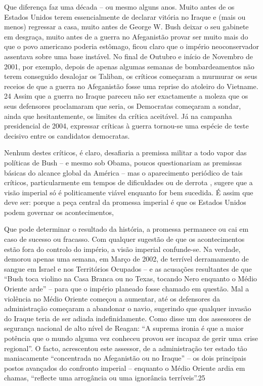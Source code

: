  \par 
Que diferença faz uma década – ou mesmo alguns anos. Muito antes de os Estados Unidos terem essencialmente de declarar vitória no Iraque e (mais ou menos) regressar a casa, muito antes de George W. Bush deixar o seu gabinete em desgraça, muito antes de a guerra no Afeganistão provar ser muito mais do que o povo americano poderia estômago, ficou claro que o império neoconservador assentava sobre uma base instável. No final de Outubro e início de Novembro de 2001, por exemplo, depois de apenas algumas semanas de bombardeamentos não terem conseguido desalojar os Taliban, os críticos começaram a murmurar os seus receios de que a guerra no Afeganistão fosse uma reprise do atoleiro do Vietname. {\color{blue}24} Assim que a guerra no Iraque pareceu não ser exactamente a moleza que os seus defensores proclamaram que seria, os Democratas começaram a sondar, ainda que hesitantemente, os limites da crítica aceitável. Já na campanha presidencial de 2004, expressar críticas à guerra tornou-se uma espécie de teste decisivo entre os candidatos democratas.
 \par 
Nenhum destes críticos, é claro, desafiaria a premissa militar a todo vapor das políticas de Bush – e mesmo sob Obama, poucos questionariam as premissas básicas do alcance global da América – mas o aparecimento periódico de tais críticos, particularmente em tempos de dificuldades ou de derrota , sugere que a visão imperial só é politicamente viável enquanto for bem sucedida. É assim que deve ser: porque a peça central da promessa imperial é que os Estados Unidos podem governar os acontecimentos,
 \par 
Que pode determinar o resultado da história, a promessa permanece ou cai em caso de sucesso ou fracasso. Com qualquer sugestão de que os acontecimentos estão fora do controlo do império, a visão imperial confunde-se. Na verdade, demorou apenas uma semana, em Março de 2002, de terrível derramamento de sangue em Israel e nos Territórios Ocupados – e as acusações resultantes de que “Bush toca violino na Casa Branca ou no Texas, tocando Nero enquanto o Médio Oriente arde” – para que o império planeado fosse chamado em questão. Mal a violência no Médio Oriente começou a aumentar, até os defensores da administração começaram a abandonar o navio, sugerindo que qualquer invasão do Iraque teria de ser adiada indefinidamente. Como disse um dos assessores de segurança nacional de alto nível de Reagan: “A suprema ironia é que a maior potência que o mundo alguma vez conheceu provou ser incapaz de gerir uma crise regional”. O facto, acrescentou este assessor, de a administração ter estado tão maniacamente “concentrada no Afeganistão ou no Iraque” – os dois principais postos avançados do confronto imperial – enquanto o Médio Oriente ardia em chamas, “reflecte uma arrogância ou uma ignorância terríveis”.{\color{blue}25}
